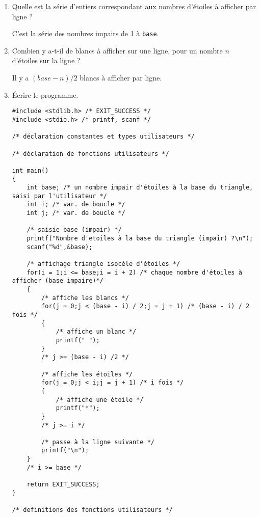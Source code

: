 \begin{enumerate}
\item Quelle est la série d'entiers correspondant aux nombres d'étoiles à afficher par ligne ?
  \begin{correction}
    C'est la série des nombres impairs de 1 à \verb|base|.
  \end{correction}
\item Combien y a-t-il de blancs à afficher sur une ligne, pour un nombre $n$ d'étoiles sur la ligne ?
  \begin{correction}
    Il y a $(base - n) / 2$ blancs à afficher par ligne.
  \end{correction}
\item Écrire le programme.
  \begin{correction}
\begin{small}
\begin{verbatim}
#include <stdlib.h> /* EXIT_SUCCESS */
#include <stdio.h> /* printf, scanf */

/* déclaration constantes et types utilisateurs */

/* déclaration de fonctions utilisateurs */

int main()
{
    int base; /* un nombre impair d'étoiles à la base du triangle, saisi par l'utilisateur */
    int i; /* var. de boucle */
    int j; /* var. de boucle */

    /* saisie base (impair) */
    printf("Nombre d'etoiles à la base du triangle (impair) ?\n");
    scanf("%d",&base);

    /* affichage triangle isocèle d'étoiles */
    for(i = 1;i <= base;i = i + 2) /* chaque nombre d'étoiles à afficher (base impaire)*/
    {
        /* affiche les blancs */
        for(j = 0;j < (base - i) / 2;j = j + 1) /* (base - i) / 2 fois */
        {
            /* affiche un blanc */
            printf(" ");
        }
        /* j >= (base - i) /2 */

        /* affiche les étoiles */
        for(j = 0;j < i;j = j + 1) /* i fois */
        {
            /* affiche une étoile */
            printf("*");
        }
        /* j >= i */

        /* passe à la ligne suivante */
        printf("\n");
    }
    /* i >= base */

    return EXIT_SUCCESS;
}

/* definitions des fonctions utilisateurs */

\end{verbatim}
\end{small}
  \end{correction}
\end{enumerate}

